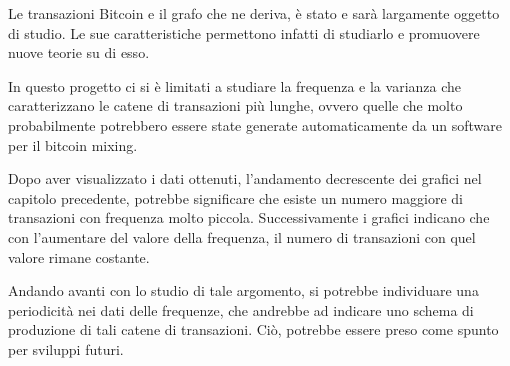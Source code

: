 Le transazioni Bitcoin e il grafo che ne deriva, è stato e sarà largamente oggetto di studio. Le sue caratteristiche permettono infatti di studiarlo e promuovere nuove teorie su di esso.

In questo progetto ci si è limitati a studiare la frequenza e la varianza che caratterizzano le catene di transazioni più lunghe, ovvero quelle che molto probabilmente potrebbero essere state generate automaticamente da un software per il bitcoin mixing. 

Dopo aver visualizzato i dati ottenuti, l'andamento decrescente dei grafici nel capitolo precedente, potrebbe significare che esiste un numero maggiore di transazioni con frequenza molto piccola. Successivamente i grafici indicano che con l'aumentare del valore della frequenza, il numero di transazioni con quel valore rimane costante.

Andando avanti con lo studio di tale argomento, si potrebbe individuare una periodicità nei dati delle frequenze, che andrebbe ad indicare uno schema di produzione di tali catene di transazioni. Ciò, potrebbe essere preso come spunto per sviluppi futuri. 